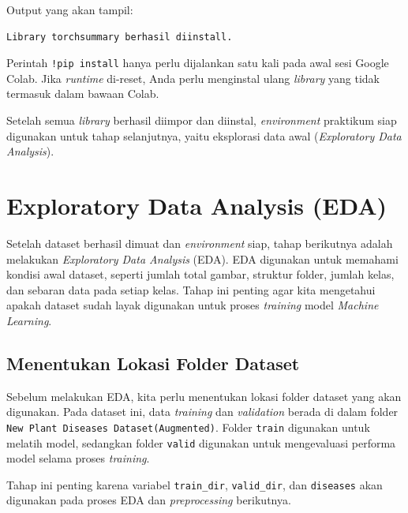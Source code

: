 Output yang akan tampil:

\begin{outputcode}[H]
\begin{lstlisting}[language={}]
Library torchsummary berhasil diinstall.
\end{lstlisting}
\caption{Output instalasi torchsummary}
\end{outputcode}

\begin{tcolorbox}[title=Catatan Penting, colback=blue!5!white, colframe=blue!70!black]
Perintah \texttt{!pip install} hanya perlu dijalankan satu kali pada awal sesi Google Colab. Jika \textit{runtime} di-reset, Anda perlu menginstal ulang \textit{library} yang tidak termasuk dalam bawaan Colab.
\end{tcolorbox}

Setelah semua \textit{library} berhasil diimpor dan diinstal, \textit{environment} praktikum siap digunakan untuk tahap selanjutnya, yaitu eksplorasi data awal (\textit{Exploratory Data Analysis}).

\section{Exploratory Data Analysis (EDA)}

Setelah dataset berhasil dimuat dan \textit{environment} siap, tahap berikutnya adalah melakukan \textit{Exploratory Data Analysis} (EDA). EDA digunakan untuk memahami kondisi awal dataset, seperti jumlah total gambar, struktur folder, jumlah kelas, dan sebaran data pada setiap kelas. Tahap ini penting agar kita mengetahui apakah dataset sudah layak digunakan untuk proses \textit{training} model \textit{Machine Learning}.

\subsection{Menentukan Lokasi Folder Dataset}

Sebelum melakukan EDA, kita perlu menentukan lokasi folder dataset yang akan digunakan. Pada dataset ini, data \textit{training} dan \textit{validation} berada di dalam folder \texttt{New Plant Diseases Dataset(Augmented)}. Folder \texttt{train} digunakan untuk melatih model, sedangkan folder \texttt{valid} digunakan untuk mengevaluasi performa model selama proses \textit{training}.

Tahap ini penting karena variabel \texttt{train\_dir}, \texttt{valid\_dir}, dan \texttt{diseases} akan digunakan pada proses EDA dan \textit{preprocessing} berikutnya.

